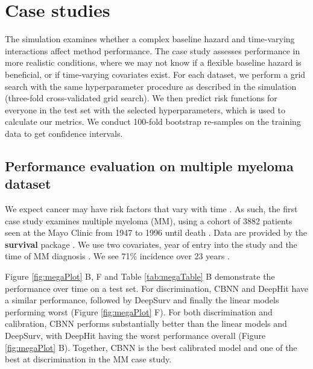 \documentclass[preprint,12pt]{elsarticle}
\begin{document}


\hypertarget{casestudies}{%
\section{Case studies}\label{casestudies}}

The simulation examines whether a complex baseline hazard and time-varying interactions affect method performance.
The case study assesses performance in more realistic conditions, where we may not know if a flexible baseline hazard is beneficial, or if time-varying covariates
exist. For each dataset, we perform a grid search with the same hyperparameter procedure as described in the simulation (three-fold cross-validated grid search).
We then predict risk functions for everyone in the test set with the selected hyperparameters, which is used to calculate our metrics. We conduct 100-fold
bootstrap re-samples on the training data to get confidence intervals.

\hypertarget{pe-multiplemyeloma}{%
\subsection{Performance evaluation on multiple myeloma dataset}\label{pe-multiplemyeloma}}
We expect cancer may have risk factors that vary with time \citep{coradini2000time}. As such, the first case study examines multiple myeloma (MM),
using a cohort of 3882 patients seen at the Mayo Clinic from 1947 to 1996 until death \citep{myeloma}. Data are provided by the \textbf{survival} package \citep{survpkg}.
We use two covariates, year of entry into the study and the time of MM diagnosis \citep{myeloma}. We see 71\% incidence over 23 years \citep{myeloma}.

Figure \ref{fig:megaPlot} B, F and Table \ref{tab:megaTable} B demonstrate the performance over time on a test set. For discrimination, CBNN and DeepHit have a
similar performance, followed by DeepSurv and finally the linear models performing worst (Figure \ref{fig:megaPlot} F). For both discrimination and calibration, CBNN
performs substantially better than the linear models and DeepSurv, with DeepHit having the worst performance overall (Figure \ref{fig:megaPlot} B). Together, CBNN
is the best calibrated model and one of the best at discrimination in the MM case study.
\end{document}
